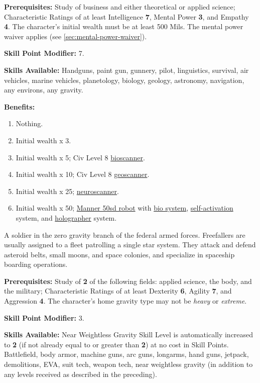 \textbf{Prerequisites:} Study of business and either theoretical or
applied science; Characteristic Ratings of at least Intelligence
\textbf{7}, Mental Power \textbf{3}, and Empathy \textbf{4}. The
character's initial wealth must be at least 500 Mils. The mental power
waiver applies (see \ref{sec:mental-power-waiver}).

\textbf{Skill Point Modifier:} 7.

\textbf{Skills Available:} Handguns, paint gun, gunnery, pilot,
linguistics, survival, air vehicles, marine vehicles, planetology,
biology, geology, astronomy, navigation, any environs, any gravity.

\pagebreak[2]
\textbf{Benefits:}
\begin{enumerate}
\item Nothing.
\item Initial wealth x 3.
\item Initial wealth x 5; Civ Level 8 \hyperlink{tag:bioscanner}{bioscanner}.
\item Initial wealth x 10; Civ Level 8 \hyperlink{tag:geoscanner}{geoscanner}.
\item Initial wealth x 25; \hyperlink{tag:neuroscanner}{neuroscanner}.
\item Initial wealth x 50; \hyperlink{tag:bot-manner-50sd}{Manner 50sd robot} with \hyperlink{tag:bot-bio}{bio system},
  \hyperlink{tag:self-activation}{self-activation} system, and \hyperlink{tag:holographer}{holographer} system.
\end{enumerate}

\bigskip

\pagebreak[2]

\label{sec:prof-freefaller}

A soldier in the zero gravity branch of the federal armed forces.
Freefallers are usually assigned to a fleet patrolling a single star
system. They attack and defend asteroid belts, small moons, and space
colonies, and specialize in spaceship boarding operations.

\textbf{Prerequisites:} Study of \textbf{2} of the following fields:
applied science, the body, and the military; Characteristic Ratings of
at least Dexterity \textbf{6}, Agility \textbf{7}, and Aggression
\textbf{4}. The character's home gravity type may not be \emph{heavy}
or \emph{extreme}.

\textbf{Skill Point Modifier:} 3.  

\textbf{Skills Available:} Near Weightless Gravity Skill Level is
automatically increased to \textbf{2} (if not already equal to or greater than
\textbf{2}) at no cost in Skill Points. Battlefield, body armor, machine guns,
arc guns, longarms, hand guns, jetpack, demolitions, EVA, suit tech,
weapon tech, near weightless gravity (in addition to any levels
received as described in the preceding).

